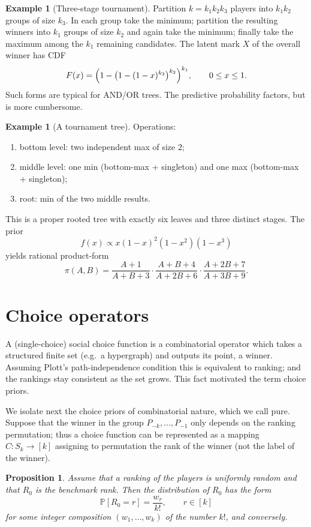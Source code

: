 \documentclass[11pt,reqno]{amsart}
\newtheorem{proposition}[theorem]{Proposition}
\theoremstyle{definition}
\newtheorem{example}[theorem]{Example}
\theoremstyle{remark}
\numberwithin{equation}{section}
\begin{document}
\begin{example}[Three-stage tournament]
Partition \(k=k_1k_2k_3\) players into \(k_1k_2\) groups of size \(k_3\). In each group take the minimum; partition the resulting winners into \(k_1\) groups of size \(k_2\) and again take the minimum; finally take the maximum among the \(k_1\) remaining candidates. The latent mark \(X\) of the overall winner has CDF
\[
F(x)=\Bigl(1-\bigl(1-(1-x)^{k_3}\bigr)^{k_2}\Bigr)^{k_1},\qquad0\le x\le1.
\]
Such forms are typical for AND/OR trees. The predictive probability factors, but is more cumbersome.
\end{example}

\begin{example}[A tournament tree]
Operations:
\begin{enumerate}[label=(\roman*)]
\item bottom level: two independent max of size \(2\);
\item middle level: one min (bottom-max + singleton) and one max (bottom-max + singleton);
\item root: min of the two middle results.
\end{enumerate}
This is a proper rooted tree with exactly six leaves and three distinct stages. The prior
\[
f(x)\propto x(1-x)^2(1-x^2)(1-x^3)
\]
yields rational product-form
\[
\pi(A,B)=\frac{A+1}{A+B+3}\cdot\frac{A+B+4}{A+2B+6}\cdot\frac{A+2B+7}{A+3B+9}.
\]
\end{example}

\section{Choice operators}

A (single-choice) social choice function is a combinatorial operator which takes a structured finite set (e.g.\ a hypergraph) and outputs its point, a winner. Assuming Plott's path-independence condition this is equivalent to ranking; and the rankings stay consistent as the set grows. This fact motivated the term choice priors.

We isolate next the choice priors of combinatorial nature, which we call pure. Suppose that the winner in the group \(P_{-k},\dots,P_{-1}\) only depends on the ranking permutation; thus a choice function can be represented as a mapping \(C:S_k\to[k]\) assigning to permutation the rank of the winner (not the label of the winner).

\begin{proposition}
Assume that a ranking of the players is uniformly random and that \(R_0\) is the benchmark rank. Then the distribution of \(R_0\) has the form
\begin{equation}\label{eq:pure}
\mathbb{P}[R_0=r]=\frac{w_r}{k!},\qquad r\in[k]
\end{equation}
for some integer composition \((w_1,\dots,w_k)\) of the number \(k!\), and conversely.
\end{proposition}
\end{document}
